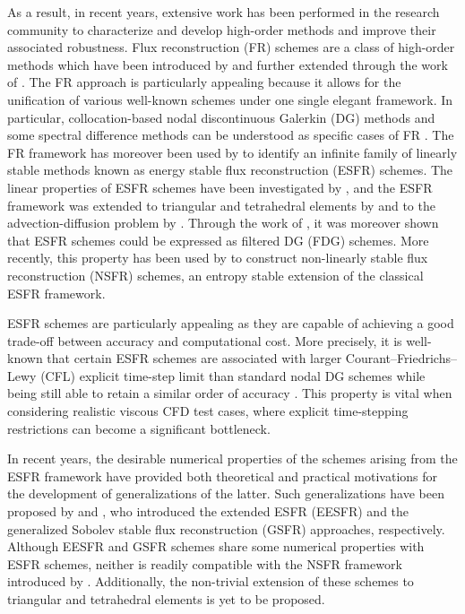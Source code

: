 \documentclass[preprint,12pt]{elsarticle}
\begin{document}
As a result, in recent years, extensive work has been performed in the research community to characterize and develop high-order methods and improve their associated robustness. Flux reconstruction (FR) schemes are a class of high-order methods which have been introduced by \cite{huynh2007flux} and further extended through the work of \cite{WANG20098161,vincent2011new}. The FR approach is particularly appealing because it allows for the unification of various well-known schemes under one single elegant framework. In particular, collocation-based nodal discontinuous Galerkin (DG) methods and some spectral difference methods can be understood as specific cases of FR \cite{huynh2007flux}. The FR framework has moreover been used by \cite{vincent2011new} to identify an infinite family of linearly stable methods known as energy stable flux reconstruction (ESFR) schemes. The linear properties of ESFR schemes have been investigated by \cite{vincent2011insights, lambert2023l2}, and the ESFR framework was extended to triangular and tetrahedral elements by \cite{williams2013energy, castonguay2012new} and to the advection-diffusion problem by \cite{quaegebeur2020insights, quaegebeur2019stability1, quaegebeur2019stability2}. Through the work of \cite{allaneau2011connections,zwanenburg2016equivalence}, it was moreover shown that ESFR schemes could be expressed as filtered DG (FDG) schemes. More recently, this property has been used by \cite{cicchino2022nonlinearly} to construct non-linearly stable flux reconstruction (NSFR) schemes, an entropy stable extension of the classical ESFR framework.

ESFR schemes are particularly appealing as they are capable of achieving a good trade-off between accuracy and computational cost. More precisely, it is well-known that certain ESFR schemes are associated with larger Courant–Friedrichs–Lewy (CFL) explicit time-step limit than standard nodal DG schemes while being still able to retain a similar order of accuracy \cite{castonguay2012new}. This property is vital when considering realistic viscous CFD test cases, where explicit time-stepping restrictions can become a significant bottleneck.

In recent years, the desirable numerical properties of the schemes arising from the ESFR framework have provided both theoretical and practical motivations for the development of generalizations of the latter. Such generalizations have been proposed by \cite{vincent2015extended} and \cite{trojak2019GSFR}, who introduced the extended ESFR (EESFR) and the generalized Sobolev stable flux reconstruction (GSFR) approaches, respectively. Although EESFR and GSFR schemes share some numerical properties with ESFR schemes, neither is readily compatible with the NSFR framework introduced by \cite{cicchino2022nonlinearly}. Additionally, the non-trivial extension of these schemes to triangular and tetrahedral elements is yet to be proposed.
\end{document}
